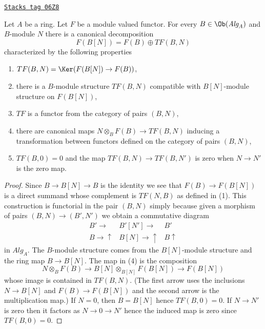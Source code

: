 \begin{lemma}
\label{adequate-lemma-tangent-functor}
\href{https://stacks.math.columbia.edu/tag/06Z8}{\texttt{Stacks tag 06Z8}}

Let $A$ be a ring. Let $F$ be a module valued functor.
For every $B \in \Ob(\textit{Alg}_A)$ and $B$-module $N$
there is a canonical decomposition
$$
F(B[N]) = F(B) \oplus TF(B, N)
$$
characterized by the following properties
\begin{enumerate}
\item $TF(B, N) = \Ker(F(B[N]) \to F(B))$,
\item there is a $B$-module structure $TF(B, N)$
compatible with $B[N]$-module structure on $F(B[N])$,
\item $TF$ is a functor from the category of pairs $(B, N)$,
\item
\label{adequate-item-mult-map}
there are canonical maps $N \otimes_B F(B) \to TF(B, N)$
inducing a transformation between functors defined on the category
of pairs $(B, N)$,
\item $TF(B, 0) = 0$ and the map $TF(B, N) \to TF(B, N')$ is
zero when $N \to N'$ is the zero map.
\end{enumerate}
\end{lemma}

\begin{proof}
Since $B \to B[N] \to B$ is the identity we see that $F(B) \to F(B[N])$
is a direct summand whose complement is $TF(N, B)$ as defined in (1).
This construction is functorial in the pair $(B, N)$ simply because
given a morphism of pairs $(B, N) \to (B', N')$ we obtain a commutative
diagram
$$
\begin{array}{ccc}B' \longrightarrow & B'[N'] \longrightarrow & B' \\ B \longrightarrow\uparrow & B[N] \longrightarrow\uparrow & B \uparrow\end{array}
$$
in $\textit{Alg}_A$. The $B$-module structure comes from the $B[N]$-module
structure and the ring map $B \to B[N]$. The map in (4) is the
composition
$$
N \otimes_B F(B) \longrightarrow
B[N] \otimes_{B[N]} F(B[N]) \longrightarrow F(B[N])
$$
whose image is contained in $TF(B, N)$. (The first arrow uses the inclusions
$N \to B[N]$ and $F(B) \to F(B[N])$ and the second arrow is the multiplication
map.) If $N = 0$, then $B = B[N]$
hence $TF(B, 0) = 0$. If $N \to N'$ is zero then it factors as
$N \to 0 \to N'$ hence the induced map is zero since $TF(B, 0) = 0$.
\end{proof}

